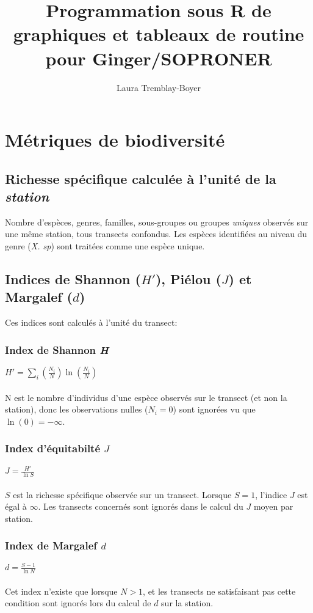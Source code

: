 \documentclass{article}
\title{Programmation sous R de graphiques et tableaux de routine
  pour Ginger/SOPRONER}
\author{Laura Tremblay-Boyer}
\begin{document}


\section{Métriques de biodiversité}
\subsection{Richesse spécifique calculée à l'unité de la
  \emph{station}}
Nombre d'espèces, genres, familles, sous-groupes ou groupes  \emph{uniques} 
observés sur une même station, tous transects confondus. Les espèces
identifiées au niveau du genre (\emph{X. sp}) sont traitées comme une
espèce unique.

\subsection{Indices de Shannon ($H'$), Piélou ($J$) et Margalef
  ($d$)}

{\large Ces indices sont calculés à l'unité du transect:}

\subsubsection{Index de Shannon \emph{H}}

$ \displaystyle H' = \sum_i \left( \frac{N_i}{N} \right)
\ln \left( \frac{N_i}{N} \right) $ \\
\\
N est le nombre d'individus d'une espèce observés sur le transect (et
non la station), donc les observations nulles ($N_i=0$) sont
ignorées vu que $\ln(0)=-\infty$.\\


\subsubsection{Index d'équitabilté $J$}
$\displaystyle J=\frac{H'}{\ln S}$ \\
\\
$S$ est la richesse spécifique observée sur un transect. Lorsque
$S=1$, l'indice $J$ est égal à $\infty$. Les transects concernés sont
ignorés dans le calcul du $J$ moyen par station. 

\subsubsection{Index de Margalef $d$}
$\displaystyle d = \frac{S-1}{\ln N} $ \\
\\
Cet index n'existe que lorsque $N>1$, et les transects
ne satisfaisant pas cette condition sont ignorés lors du calcul de $d$
sur la station. 
\end{document}
